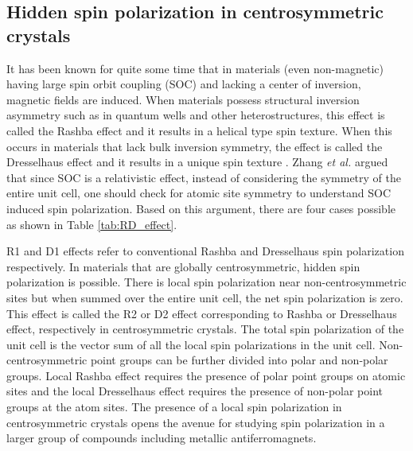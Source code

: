 \documentclass[10pt,doublespacing,edeposit]{uiucthesis2020}
\begin{document}
\begin{mainmatter}
\section{Hidden spin polarization in centrosymmetric crystals}

It has been known for quite some time that in materials (even non-magnetic) having large spin orbit coupling (SOC) and lacking a center of inversion, magnetic fields are induced. When materials possess structural inversion asymmetry such as in quantum wells and other heterostructures, this effect is called the Rashba effect and it results in a helical type spin texture. When this occurs in materials that lack bulk inversion symmetry, the effect is called the Dresselhaus effect and it results in a unique spin texture \cite{Zhang2014}. Zhang \emph{et al.} \cite{Zhang2014} argued that since SOC is a relativistic effect, instead of considering the symmetry of the entire unit cell, one should check for atomic site symmetry to understand SOC induced spin polarization. Based on this argument, there are four cases possible as shown in Table \ref{tab:RD_effect}.

R1 and D1 effects refer to conventional Rashba and Dresselhaus spin polarization respectively. In materials that are globally centrosymmetric, hidden spin polarization is possible. There is local spin polarization near non-centrosymmetric sites but when summed over the entire unit cell, the net spin polarization is zero. This effect is called the R2 or D2 effect corresponding to Rashba or Dresselhaus effect, respectively in centrosymmetric crystals. The total spin polarization of the unit cell is the vector sum of all the local spin polarizations in the unit cell. Non-centrosymmetric point groups can be further divided into polar and non-polar groups. Local Rashba effect requires the presence of polar point groups on atomic sites and the local Dresselhaus effect requires the presence of non-polar point groups at the atom sites. The presence of a local spin polarization in centrosymmetric crystals opens the avenue for studying spin polarization in a larger group of compounds including metallic antiferromagnets.


\end{mainmatter}
\end{document}
